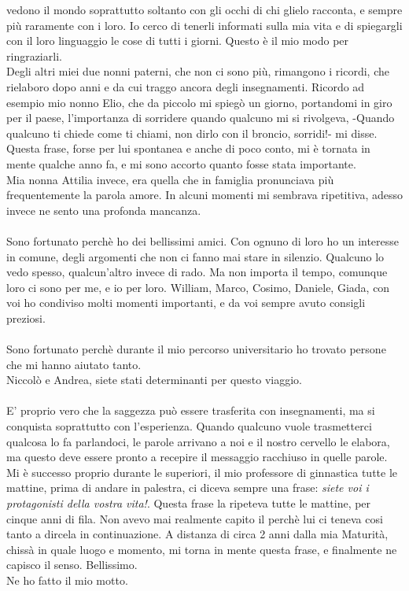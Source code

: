 vedono il mondo soprattutto soltanto con gli occhi di chi glielo racconta, e sempre più raramente con i loro. Io cerco di tenerli informati sulla mia vita e di spiegargli
con il loro linguaggio le cose di tutti i giorni. Questo è il mio modo per ringraziarli.
\\Degli altri miei due nonni paterni, che non ci sono più, rimangono i ricordi, che rielaboro dopo anni e da cui traggo ancora degli insegnamenti.
Ricordo ad esempio mio nonno Elio, che da piccolo mi spiegò un giorno, portandomi in giro per il paese, l'importanza di sorridere quando qualcuno mi si rivolgeva,
 -Quando qualcuno ti chiede come ti chiami, non dirlo con il broncio, sorridi!- mi disse.
 Questa frase, forse per lui spontanea e anche di poco conto, mi è tornata in mente qualche anno fa, e mi sono accorto quanto fosse stata importante.
 \\
 Mia nonna Attilia invece, era quella che in famiglia pronunciava più frequentemente la parola amore. In alcuni momenti mi sembrava ripetitiva, 
 adesso invece ne sento una profonda mancanza.
\\\\
Sono fortunato perchè ho dei bellissimi amici. Con ognuno di loro ho un interesse in comune, degli argomenti che non ci fanno mai stare in silenzio.
Qualcuno lo vedo spesso, qualcun'altro invece di rado. Ma non importa il tempo, comunque loro ci sono per me, e io per loro.
William, Marco, Cosimo, Daniele, Giada, con voi ho condiviso molti momenti importanti, e da voi sempre avuto consigli preziosi.
\\\\
Sono fortunato perchè durante il mio percorso universitario ho trovato persone che mi hanno aiutato tanto.
\\Niccolò e Andrea, siete stati determinanti per questo viaggio.
\\\\
 E' proprio vero che la saggezza può essere trasferita con insegnamenti, ma si conquista soprattutto con l'esperienza.
 Quando qualcuno vuole trasmetterci qualcosa lo fa parlandoci, 
 le parole arrivano a noi e il nostro cervello le elabora, ma questo deve essere pronto a recepire il messaggio racchiuso in quelle parole.
 Mi è successo proprio durante le superiori, il mio professore di ginnastica tutte le mattine, prima di andare in palestra, ci diceva sempre una frase: 
 \emph{siete voi i protagonisti della vostra vita!}. Questa frase la ripeteva tutte le mattine, per cinque anni di fila. 
 Non avevo mai realmente capito il perchè lui ci teneva cosi tanto a dircela in continuazione.
 A distanza di circa 2 anni dalla mia Maturità, chissà in quale luogo e momento, mi torna in mente questa frase, e finalmente ne capisco il senso. Bellissimo.
 \\Ne ho fatto il mio motto.